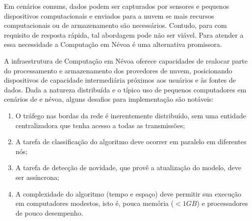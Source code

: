Em cenários \iot comuns, dados podem ser capturados por sensores e pequenos dispositivos
computacionais e enviados para a nuvem se mais recursos
computacionais ou de armazenamento são necessários. Contudo, para \nids com 
requisito de resposta rápida, tal abordagem pode não ser viável. 
Para atender a essa necessidade a Computação em Névoa é uma alternativa promissora.

A infraestrutura de Computação em Névoa oferece capacidades de realocar
parte do processamento e armazenamento dos provedores de nuvem, posicionando
dispositivos de capacidade intermediária próximos aos usuários e às fontes de dados.
Dada a natureza distribuída e o típico uso de pequenos computadores em cenários
de \iot e névoa, alguns desafios para implementação \nids são notáveis:
\begin{enumerate}[label=(\emph{\roman*})]

  \item O tráfego nas bordas da rede é inerentemente distribuído, sem uma
  entidade centralizadora que tenha acesso a todas as transmissões;
  
  \item A tarefa de classificação do algoritmo deve ocorrer em paralelo em
  diferentes nós;
  
  \item A tarefa de detecção de novidade, que provê a atualização do modelo,
  deve ser assíncrona;
    
  \item A complexidade do algoritmo (tempo e espaço) deve permitir sua execução em
  computadores modestos, isto é, pouca memória ($< 1GB$) e processadores de
  pouco desempenho.

\end{enumerate}

